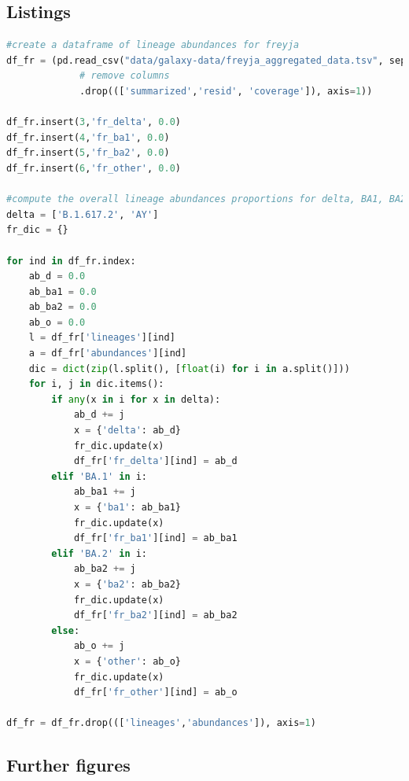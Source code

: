     \subsection{Listings}
\begin{lstlisting}[language=python, caption=python script to compute the overall lineage abundances proportions of considered lineages in mock dataset for Freyja output, label=list:methods:freyja-vocs-abundances]
#create a dataframe of lineage abundances for freyja
df_fr = (pd.read_csv("data/galaxy-data/freyja_aggregated_data.tsv", sep='\t')
             # remove columns
             .drop((['summarized','resid', 'coverage']), axis=1))
            
df_fr.insert(3,'fr_delta', 0.0)
df_fr.insert(4,'fr_ba1', 0.0)
df_fr.insert(5,'fr_ba2', 0.0)
df_fr.insert(6,'fr_other', 0.0)

#compute the overall lineage abundances proportions for delta, BA1, BA2, and other for Freyja output
delta = ['B.1.617.2', 'AY']
fr_dic = {}

for ind in df_fr.index:
    ab_d = 0.0
    ab_ba1 = 0.0
    ab_ba2 = 0.0
    ab_o = 0.0
    l = df_fr['lineages'][ind]
    a = df_fr['abundances'][ind]
    dic = dict(zip(l.split(), [float(i) for i in a.split()]))
    for i, j in dic.items():
        if any(x in i for x in delta):
            ab_d += j
            x = {'delta': ab_d}
            fr_dic.update(x)
            df_fr['fr_delta'][ind] = ab_d
        elif 'BA.1' in i:
            ab_ba1 += j
            x = {'ba1': ab_ba1}
            fr_dic.update(x)
            df_fr['fr_ba1'][ind] = ab_ba1
        elif 'BA.2' in i:
            ab_ba2 += j
            x = {'ba2': ab_ba2}
            fr_dic.update(x)
            df_fr['fr_ba2'][ind] = ab_ba2
        else:
            ab_o += j
            x = {'other': ab_o}
            fr_dic.update(x)
            df_fr['fr_other'][ind] = ab_o
        
df_fr = df_fr.drop((['lineages','abundances']), axis=1)
\end{lstlisting}
    \subsection{Further figures}
